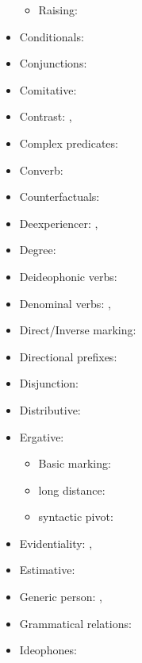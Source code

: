 \documentclass[oldfontcommands,oneside,a4paper,11pt]{article}
\begin{document}
\begin{itemize}
\begin{itemize}
\item  Raising: \citet{jacques15causative}
\end{itemize}
\item Conditionals:  \citet[296-300]{jacques14linking}
\item Conjunctions:  \citet[276-7]{jacques14linking}
\item Comitative: \citet[272-4]{jacques14linking}
\item Contrast:  \citet[315-8]{jacques14linking}, \citet{jacques16comparative}
\item Complex predicates: \citet{jacques12incorp}
\item Converb:  \citet[269-272;307-8;321-2]{jacques14linking}
\item Counterfactuals:  \citet[301-2]{jacques14linking}
\item Deexperiencer: \citet[216-7]{jacques12demotion}, \citet{jacques14antipassive}
\item Degree: \citet{jacques16comparative}
\item Deideophonic verbs: \citet[278-282]{japhug14ideophones}
\item Denominal verbs:  \citet{jacques12incorp}, \citet{jacques14antipassive}
\item Direct/Inverse marking: \citet{jacques10inverse}
\item Directional prefixes:  \citet[267-8]{jacques14linking}
\item Disjunction:  \citet[318-9]{jacques14linking}
\item Distributive: \citet{jacques16comparative}
\item Ergative:   \citet{jacques16comparative}
\begin{itemize}
\item Basic marking: \citet[131-2]{jacques10inverse}
\item long distance: \citet[278]{jacques14linking}
\item syntactic pivot:   \citet[208]{jacques12demotion}
\end{itemize}
\item Evidentiality: \citet[380-390]{jacques04these}, \citet{jacques08}
\item Estimative: \citet{jacques13tropative}
\item Generic person:   \citet[204-8]{jacques12demotion}, \citet{jacques17generic}
\item Grammatical relations: \citet{jacques16relatives}
\item Ideophones: \citet{japhug14ideophones}

\end{itemize}
\end{document}
